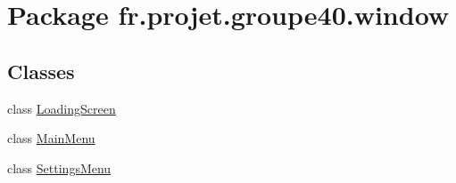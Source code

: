 \hypertarget{namespacefr_1_1projet_1_1groupe40_1_1window}{}\section{Package fr.\+projet.\+groupe40.\+window}
\label{namespacefr_1_1projet_1_1groupe40_1_1window}
\subsection*{Classes}
\begin{DoxyCompactItemize}
\item 
class \hyperlink{classfr_1_1projet_1_1groupe40_1_1window_1_1_loading_screen}{Loading\+Screen}
\item 
class \hyperlink{classfr_1_1projet_1_1groupe40_1_1window_1_1_main_menu}{Main\+Menu}
\item 
class \hyperlink{classfr_1_1projet_1_1groupe40_1_1window_1_1_settings_menu}{Settings\+Menu}
\end{DoxyCompactItemize}
